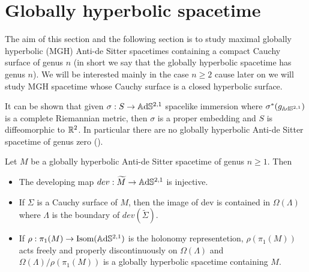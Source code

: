 \section{Globally hyperbolic spacetime}
The aim of this section and the following section is to study maximal globally hyperbolic (MGH) Anti-de Sitter spacetimes containing a compact Cauchy surface of genus $n$ (in short we say that the globally hyperbolic spacetime has genus $n$). We will be interested mainly in the case $n\geq 2$ cause later on we will study MGH spacetime whose Cauchy surface is a closed hyperbolic surface.\\ 
\begin{observation}
    It can be shown that given $\sigma :S \to\mathbb{A}\mathrm{d}\mathbb{S}^{2,1}$ spacelike immersion where $\sigma^*(g_{\mathbb{A}\mathrm{d}\mathbb{S}^{2,1}})$ is a complete Riemannian metric, then $\sigma$ is a proper embedding and $S$ is diffeomorphic to $\mathbb{R}^2$.
    In particular there are no globally hyperbolic Anti-de Sitter spacetime of genus zero (\cite{bonsanteseppi}).
\end{observation}
\begin{proposition}\label{prop:GH_geometry}
    Let $M$ be a globally hyperbolic Anti-de Sitter spacetime of genus $n\geq 1$. Then
    \begin{itemize}
        \item The developing map $dev: \widetilde{M} \to\mathbb{A}\mathrm{d}\mathbb{S}^{2,1}$ is injective.
        \item If $\Sigma$ is a Cauchy surface of $M$, then the image of dev is contained in $\Omega(\Lambda)$ where $\Lambda$ is the boundary of $dev(\widetilde{\Sigma})$.
        \item If $\rho : \pi_1(M) \to \text{Isom}(\mathbb{A}\mathrm{d}\mathbb{S}^{2,1})$ is the holonomy representetion, $\rho(\pi_1(M))$ acts freely and properly discontinuously on $\Omega(\Lambda)$ and $\Omega(\Lambda) / \rho(\pi_1(M))$ is a globally hyperbolic spacetime containing $M$.
    \end{itemize}
\end{proposition}
